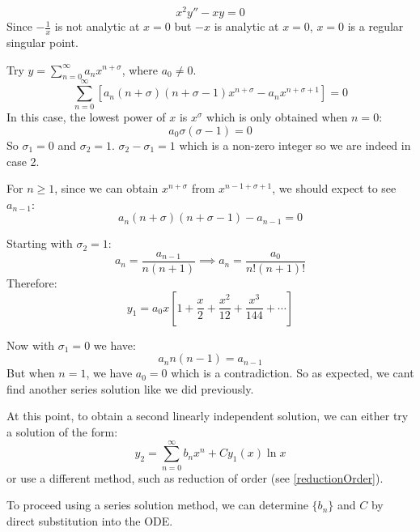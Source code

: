 \documentclass[../main.tex]{subfiles}
\begin{document}
\begin{example}[Case 2]
  \[
    x^2y'' - xy = 0
  \]
  Since $-\frac{1}{x}$ is not analytic at $x = 0$ but $-x$ is analytic at $x = 0$, $x = 0$ is a regular singular point.

  Try $y = \sum_{n=0}^{\infty} a_nx^{n + \sigma}$, where $a_0 \neq 0$.
  \[
    \sum_{n=0}^{\infty} \left[a_n(n + \sigma)(n + \sigma - 1)x^{n + \sigma} - a_nx^{n + \sigma + 1}\right] = 0
  \]
  In this case, the lowest power of $x$ is $x^{\sigma}$ which is only obtained when $n = 0$:
  \[
    a_0\sigma(\sigma -  1) = 0
  \]
  So $\sigma_1 = 0$ and $\sigma_2 = 1$.
  $\sigma_2 - \sigma_1 = 1$ which is a non-zero integer so we are indeed in case 2.

  For $n \geq 1$, since we can obtain $x^{n + \sigma}$ from $x^{n - 1 + \sigma + 1}$, we should expect to see $a_{n- 1}$:
  \[
    a_n (n + \sigma)(n + \sigma - 1) - a_{n - 1} = 0
  \]

  Starting with $\sigma_2 = 1$:
  \[
    a_n = \frac{a_{n - 1}}{n(n + 1)} \implies a_n = \frac{a_0}{n!(n + 1)!}
  \]
  Therefore:
  \[
    y_1 = a_0 x \left[1 + \frac{x}{2} + \frac{x^2}{12} + \frac{x^3}{144} + \cdots\right]
  \]

  Now with $\sigma_1 = 0$ we have:
  \[
    a_n n(n - 1) = a_{n - 1}
  \]
  But when $n = 1$, we have $a_0 = 0$ which is a contradiction.
  So as expected, we cant find another series solution like we did previously.

  At this point, to obtain a second linearly independent solution, we can either try a solution of the form:
  \[
    y_2 = \sum_{n=0}^{\infty} b_n x^{n} + Cy_1(x)\ln x
  \]
  or use a different method, such as reduction of order (see \cref{reductionOrder}).

  \nonexaminable
  To proceed using a series solution method, we can determine $\{b_n\}$ and $C$ by direct substitution into the ODE.


\end{example}
\end{document}
